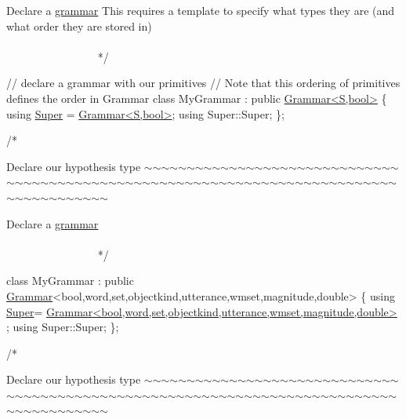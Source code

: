 \begin{DoxyCode}
    Declare a \hyperlink{class_l_o_t_hypothesis_affae32db28c39df676809ae47e14e7cf}{grammar}
    This requires a \textcolor{keyword}{template} to specify what types they are (and what order they are stored in)
   ~~~~~~~~~~~~~~~~~~~~~~~~~~~~~~~~~~~~~~~~~~~~~~~~~~~~~~~~~~~~~~~~~~~~~~~~~~~~~~~~~~~~~~~~ */



\textcolor{comment}{// declare a grammar with our primitives}
\textcolor{comment}{// Note that this ordering of primitives defines the order in Grammar}
\textcolor{keyword}{class }MyGrammar : \textcolor{keyword}{public} \hyperlink{class_grammar}{Grammar<S,bool>} \{
    \textcolor{keyword}{using} \hyperlink{class_my_hypothesis_a12e3d952f8fca502912d3bd868fa9f99}{Super} = \hyperlink{class_grammar}{Grammar<S,bool>};
    \textcolor{keyword}{using} Super::Super;
\};

\textcolor{comment}{/*}
\end{DoxyCode}
 Declare our hypothesis type $\sim$$\sim$$\sim$$\sim$$\sim$$\sim$$\sim$$\sim$$\sim$$\sim$$\sim$$\sim$$\sim$$\sim$$\sim$$\sim$$\sim$$\sim$$\sim$$\sim$$\sim$$\sim$$\sim$$\sim$$\sim$$\sim$$\sim$$\sim$$\sim$$\sim$$\sim$$\sim$$\sim$$\sim$$\sim$$\sim$$\sim$$\sim$$\sim$$\sim$$\sim$$\sim$$\sim$$\sim$$\sim$$\sim$$\sim$$\sim$$\sim$$\sim$$\sim$$\sim$$\sim$$\sim$$\sim$$\sim$$\sim$$\sim$$\sim$$\sim$$\sim$$\sim$$\sim$$\sim$$\sim$$\sim$$\sim$$\sim$$\sim$$\sim$$\sim$$\sim$$\sim$$\sim$$\sim$$\sim$$\sim$$\sim$$\sim$$\sim$$\sim$$\sim$$\sim$$\sim$$\sim$$\sim$$\sim$$\sim$


\begin{DoxyCode}
    Declare a \hyperlink{class_l_o_t_hypothesis_affae32db28c39df676809ae47e14e7cf}{grammar}
   ~~~~~~~~~~~~~~~~~~~~~~~~~~~~~~~~~~~~~~~~~~~~~~~~~~~~~~~~~~~~~~~~~~~~~~~~~~~~~~~~~~~~~~~~ */



\textcolor{keyword}{class }MyGrammar : \textcolor{keyword}{public} \hyperlink{class_grammar}{Grammar}<bool,word,set,objectkind,utterance,wmset,magnitude,double> \{
    \textcolor{keyword}{using} \hyperlink{class_my_hypothesis_a12e3d952f8fca502912d3bd868fa9f99}{Super}=
      \hyperlink{class_grammar}{Grammar<bool,word,set,objectkind,utterance,wmset,magnitude,double>}
      ;
    \textcolor{keyword}{using} Super::Super;
\};

\textcolor{comment}{/*}
\end{DoxyCode}
 Declare our hypothesis type $\sim$$\sim$$\sim$$\sim$$\sim$$\sim$$\sim$$\sim$$\sim$$\sim$$\sim$$\sim$$\sim$$\sim$$\sim$$\sim$$\sim$$\sim$$\sim$$\sim$$\sim$$\sim$$\sim$$\sim$$\sim$$\sim$$\sim$$\sim$$\sim$$\sim$$\sim$$\sim$$\sim$$\sim$$\sim$$\sim$$\sim$$\sim$$\sim$$\sim$$\sim$$\sim$$\sim$$\sim$$\sim$$\sim$$\sim$$\sim$$\sim$$\sim$$\sim$$\sim$$\sim$$\sim$$\sim$$\sim$$\sim$$\sim$$\sim$$\sim$$\sim$$\sim$$\sim$$\sim$$\sim$$\sim$$\sim$$\sim$$\sim$$\sim$$\sim$$\sim$$\sim$$\sim$$\sim$$\sim$$\sim$$\sim$$\sim$$\sim$$\sim$$\sim$$\sim$$\sim$$\sim$$\sim$$\sim$$\sim$


